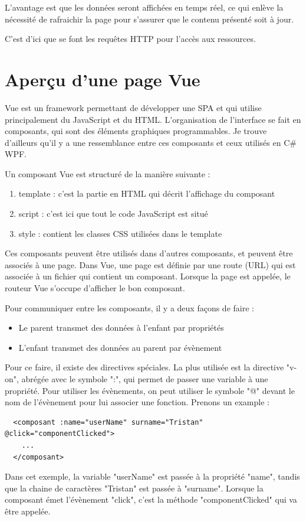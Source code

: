 \documentclass[
    iai, %
    eai, %
]{heig-tb}
\begin{document}
L'avantage est que les données seront affichées en temps réel, ce qui enlève la nécessité de rafraichir la page pour s'assurer que le contenu présenté soit à jour.

C'est d'ici que se font les requêtes HTTP pour l'accès aux ressources.

\section{Aperçu d'une page Vue}
Vue est un framework permettant de développer une SPA et qui utilise principalement du JavaScript et du HTML.
L'organisation de l'interface se fait en composants, qui sont des éléments graphiques programmables.
Je trouve d'ailleurs qu'il y a une ressemblance entre ces composants et ceux utilisés en C\# WPF.

Un composant Vue est structuré de la manière suivante :
\begin{enumerate}
  \item template : c'est la partie en HTML qui décrit l'affichage du composant
  \item script : c'est ici que tout le code JavaScript est situé
  \item style : contient les classes CSS utilisées dans le template
\end{enumerate}
\bigskip
Ces composants peuvent être utilisés dans d'autres composants, et peuvent être associés à une page.
Dans Vue, une page est définie par une route (URL) qui est associée à un fichier qui contient un composant.
Lorsque la page est appelée, le routeur Vue s'occupe d'afficher le bon composant.

Pour communiquer entre les composants, il y a deux façons de faire :
\begin{itemize}
  \item Le parent transmet des données à l'enfant par propriétés
  \item L'enfant transmet des données au parent par évènement
\end{itemize}
\bigskip
\newpage

Pour ce faire, il existe des directives spéciales.
La plus utilisée est la directive "v-on", abrégée avec le symbole ":", qui permet de passer une variable à une propriété.
Pour utiliser les évènements, on peut utiliser le symbole "@" devant le nom de l'évènement pour lui associer une fonction.
Prenons un example :
\begin{verbatim}
  <composant :name="userName" surname="Tristan" @click="componentClicked">
    ...
  </composant>
\end{verbatim}
Dans cet exemple, la variable "userName" est passée à la propriété "name", tandis que la chaine de caractères "Tristan" est passée à "surname".
Lorsque la composant émet l'évènement "click", c'est la méthode "componentClicked" qui va être appelée.
\end{document}
